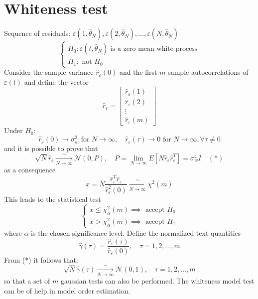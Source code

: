 \documentclass{book}
\theoremstyle{definition}
\theoremstyle{remark}
\theoremstyle{remark}
\begin{document}
\section{Whiteness test}
Sequence of residuals: $\varepsilon(1,\hat{\theta}_N),\varepsilon(2,\hat{\theta}_N),\dots,\varepsilon(N,\hat{\theta}_N)$
\[
    \begin{cases}
        H_0 : \varepsilon(t,\hat{\theta}_N) \text{ is a zero mean white process}\\
        H_1 : \text{ not } H_0
    \end{cases}
\]
Consider the sample variance $\hat{r}_\varepsilon(0)$ and the first $m$ sample autocorrelations of $\varepsilon(t)$ and define the vector
\[
    \hat{r}_\varepsilon = \begin{bmatrix}
        \hat{r}_\varepsilon(1)\\
        \hat{r}_\varepsilon(2)\\
        \vdots\\
        \hat{r}_\varepsilon(m)
    \end{bmatrix}
\]
Under $H_0$:
\[
    \hat{r}_\varepsilon(0)\to \sigma_w^2 \text{ for } N\to\infty,\quad \hat{r}_\varepsilon(\tau)\to 0 \text{ for } N\to\infty, \forall \tau \neq 0
\]
and it is possible to prove that
\[
    \sqrt{N}\hat{r}_\varepsilon\xrightarrow[N\to\infty]\sim \mathcal{N}(0,P), \quad P=\lim_{N\to\infty} E[N\hat{r}_\varepsilon\hat{r}_\varepsilon^T]=\sigma_w^4I \quad (*)
\]
as a consequence
\[
    x=N\displaystyle\frac{\hat{r}_\varepsilon^T\hat{r}_\varepsilon}{\hat{r}_\varepsilon^2(0)}\xrightarrow[N\to\infty]\sim \chi^2(m)
\]
This leads to the statistical test
\[
    \begin{cases}
        x\leq \chi_\alpha^2(m) \implies \text{ accept }H_0\\
        x>\chi_\alpha^2(m) \implies \text{ accept }H_1
    \end{cases}
\]
where $\alpha$ is the chosen significance level. Define the normalized text quantities
\[
    \hat{\gamma}(\tau)=\displaystyle\frac{\hat{r}_\varepsilon(\tau)}{\hat{r}_\varepsilon(0)}, \quad \tau= 1,2,\dots,m
\]
From (*) it follows that:
\[
    \sqrt{N}\hat{\gamma}(\tau)\xrightarrow[N\to\infty]\sim \mathcal{N}(0,1), \quad \tau=1,2,\dots,m
\]
so that a set of $m$ gaussian tests can also be performed.
The whiteness model test can be of help in model order estimation. 
\end{document}

